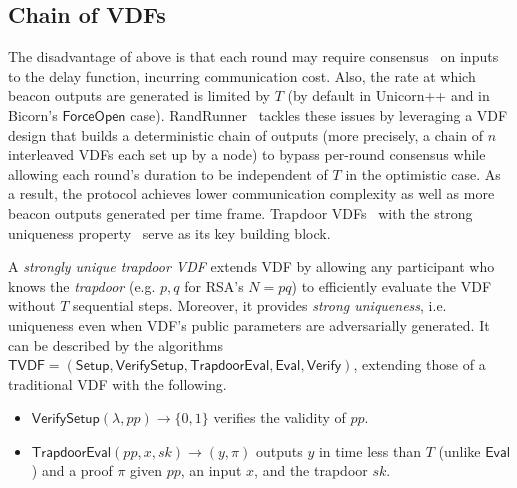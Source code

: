 \subsection{Chain of VDFs}
\label{subsection:randrunner}
The disadvantage of above is that each round may require consensus~\cite{castro1999practical} on inputs to the delay function, incurring communication cost.
Also, the rate at which beacon outputs are generated is limited by $T$ (by default in Unicorn++ and in Bicorn's $\mathsf{ForceOpen}$ case).
RandRunner~\cite{schindler2021randrunner} tackles these issues by leveraging a VDF design that builds a deterministic chain of outputs (more precisely, a chain of $n$ interleaved VDFs each set up by a node) to bypass per-round consensus while allowing each round's duration to be independent of $T$ in the optimistic case.
As a result, the protocol achieves lower communication complexity as well as more beacon outputs generated per time frame.
Trapdoor VDFs~\cite{wesolowski2019efficient} with the strong uniqueness property~\cite{schindler2021randrunner} serve as its key building block.

\begin{definition}
A \textit{strongly unique trapdoor VDF} extends VDF by allowing any participant who knows the \textit{trapdoor} (e.g. $p, q$ for RSA's $N = p q$) to efficiently evaluate the VDF without $T$ sequential steps. Moreover, it provides \textit{strong uniqueness}, i.e. uniqueness even when VDF's public parameters are adversarially generated. It can be described by the algorithms $\mathsf{TVDF} = (\mathsf{Setup}, \mathsf{VerifySetup}, \mathsf{TrapdoorEval}, \mathsf{Eval}, \mathsf{Verify})$, extending those of a traditional VDF with the following.
\begin{itemize}
    \item $\mathsf{VerifySetup}(\lambda, pp) \rightarrow \{0, 1\}$ verifies the validity of $pp$.
    \item $\mathsf{TrapdoorEval}(pp, x, sk) \rightarrow (y, \pi)$ outputs $y$ in time less than $T$ (unlike $\mathsf{Eval}$) and a proof $\pi$ given $pp$, an input $x$, and the trapdoor $sk$.
\end{itemize}
\end{definition}

